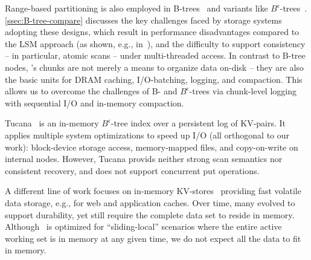 Range-based  partitioning is also employed in  B-trees~\cite{Knuth:1998:ACP:280635} and variants like $B^{\epsilon}$-trees~\cite{Brodal:2003:LBE:644108.644201}.
 \cref{ssec:B-tree-compare} discusses the key challenges faced by storage systems adopting these designs, which 
 result in performance disadvantages compared to the LSM approach  (as shown, e.g., in~\cite{toku-rocks-inno}), 
 and the difficulty to support consistency  -- in particular, atomic scans --   under multi-threaded access.
 In contrast to B-tree nodes, \sys's chunks are not merely  a means to organize data on-disk -- they 
are also the basic units for DRAM caching, I/O-batching, logging, and compaction. 
This allows us to overcome the challenges of B- and $B^{\epsilon}$-trees via chunk-level logging with sequential I/O and 
in-memory compaction.
 

Tucana~\cite{tucana} is an in-memory $B^{\epsilon}$-tree index over a persistent log of KV-pairs. It applies multiple system
optimizations to speed up I/O (all orthogonal to our work): block-device storage access, memory-mapped files, and copy-on-write 
on internal nodes. However, Tucana provids neither strong scan semantics nor consistent recovery, and does not support concurrent put operations.

A different line of work focuses on 
in-memory KV-stores~\cite{ignite, redis, memcached, Srinivasan:2016:AAR:3007263.3007276} providing fast volatile 
data storage, e.g., for web and application caches. Over time, many evolved to support durability,
yet still require the complete data set to reside in memory.
Although \sys\ is optimized for ``sliding-local'' scenarios where the entire active working set is in memory at any given time, 
we do not expect all  the data to fit in memory. 

